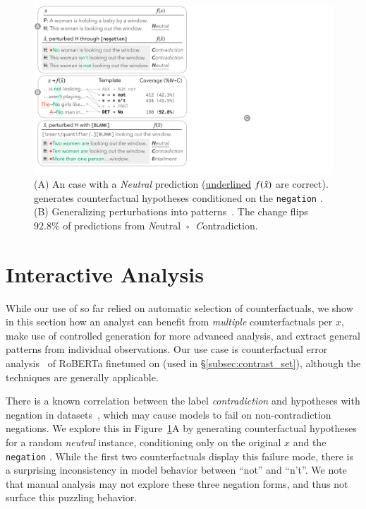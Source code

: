 
\begin{figure}[t]
\centering
\includegraphics[trim={0 12.5cm 33cm 0cm},clip,width=1\columnwidth]{figures/err_analysis.pdf}
\vspace{-5pt}
\caption{
(A) An \nli case with a \emph{Neutral} prediction (\uline{underlined} $f(\hat{x})$ are correct).
\sysname generates counterfactual hypotheses conditioned on the \texttt{negation} \tagstr. 
(B) Generalizing perturbations into patterns~\cite{wu2020tempura}. The change  flips $92.8\%$ of predictions from \emph{N}eutral~$\veryshortarrow$~\emph{C}ontradiction.
}
\vspace{-5pt}
\label{fig:err_analysis}
\end{figure}

\section{Interactive Analysis}
\label{sec:app_err_analysis}

While our use of \sysname so far relied on automatic selection of counterfactuals, we show in this section how an analyst can benefit from \emph{multiple} counterfactuals per $x$, make use of controlled generation for more advanced analysis, and extract general patterns from individual observations.
Our use case is counterfactual error analysis~\cite{wu2019errudite} of RoBERTa finetuned on \nli (used in \S\ref{subsec:contrast_set}), although the techniques are generally applicable.

There is a known correlation between the label \emph{contradiction} and hypotheses with negation in \nli datasets~\cite{gururangan2018annotation}, which may cause models to fail on non-contradiction negations.
We explore this in Figure~\ref{fig:err_analysis}A by generating counterfactual hypotheses for a random \emph{neutral} instance, conditioning only on the original $x$ and the \texttt{negation} \tagstr.
While the first two counterfactuals display this failure mode, there is a surprising inconsistency in model behavior between ``not'' and ``n't''.
We note that manual analysis may not explore these three negation forms, and thus not surface this puzzling behavior.



